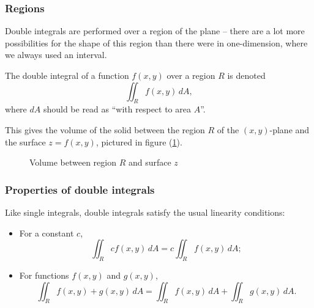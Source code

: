   \subsubsection*{Regions}

  Double integrals are performed over a region of the plane -- there are a lot more possibilities for the shape of this region than there were in one-dimension, where we always used an interval.

  The double integral of a function $f(x, y)$ over a region $R$ is denoted
    \[
      \iint_R f(x, y) \, dA,
    \]
  where $dA$ should be read as ``with respect to area $A$''.

  This gives the volume of the solid between the region $R$ of the $(x, y)$-plane and the surface $z = f(x, y)$, pictured in figure (\ref{doubleintegral3d}).
  \begin{figure}[H]
    \centering
    \def\svgwidth{0.6\columnwidth}
    
    \caption{Volume between region $R$ and surface $z$}
    \label{doubleintegral3d}
  \end{figure}



  \subsubsection*{Properties of double integrals}

  Like single integrals, double integrals satisfy the usual linearity conditions:
    \begin{itemize}
      \item For a constant $c$,
    \[
      \iint_R cf(x, y) \, dA = c\iint_R f(x, y) \, dA;
    \]
      \item For functions $f(x, y)$ and $g(x, y)$,
    \[
      \iint_R f(x, y) + g(x, y) \, dA = \iint_R f(x, y)\, dA + \iint_R g(x, y) \, dA.
    \]
    \end{itemize}

